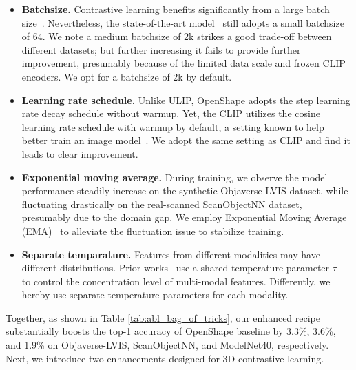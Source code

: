 \documentclass{article} \usepackage{iclr2024_conference,times}
\begin{document}
\begin{itemize}[leftmargin=*,itemsep=.5ex]
\vspace{-.55em}
    \item \textbf{Batchsize.} Contrastive learning benefits significantly from a large batch size~\citep{openclip,openai_clip}. 
Nevertheless, the state-of-the-art model~\citep{ulip} still adopts a small batchsize of 64. 
We note a medium batchsize of 2k strikes a good trade-off between different datasets; but further increasing it fails to provide further improvement, presumably because of the limited data scale and frozen CLIP encoders. 
We opt for a batchsize of 2k by default.
\item \textbf{Learning rate schedule.} Unlike ULIP, OpenShape adopts the step learning rate decay schedule without warmup. 
Yet, the CLIP utilizes the cosine learning rate schedule with warmup by default, a setting known to help better train an image model~\citep{he2019bag}.
    We adopt the same setting as CLIP and find it leads to clear improvement.
    \item \textbf{Exponential moving average.} During training, we observe the model performance steadily increase on the synthetic Objaverse-LVIS dataset, while fluctuating drastically on the real-scanned ScanObjectNN dataset, presumably due to the domain gap.
We employ Exponential Moving Average (EMA)~\citep{mean_teacher} to alleviate the fluctuation issue to stabilize training.
    \item \textbf{Separate temparature.} 
    Features from different modalities may have different distributions. Prior works~\citep{ulip,openshape} use a shared temperature parameter $\tau$~\citep{wu2018unsupervised} to control the concentration level of multi-modal features.
    Differently, we hereby use separate temperature parameters for each modality. 
\end{itemize}

Together, as shown in Table \ref{tab:abl_bag_of_tricks}, our enhanced recipe substantially boosts the top-1 accuracy of OpenShape baseline by 3.3\%, 3.6\%, and 1.9\% on Objaverse-LVIS, ScanObjectNN, and ModelNet40, respectively. 
Next, we introduce two enhancements designed for 3D contrastive learning.
\end{document}
